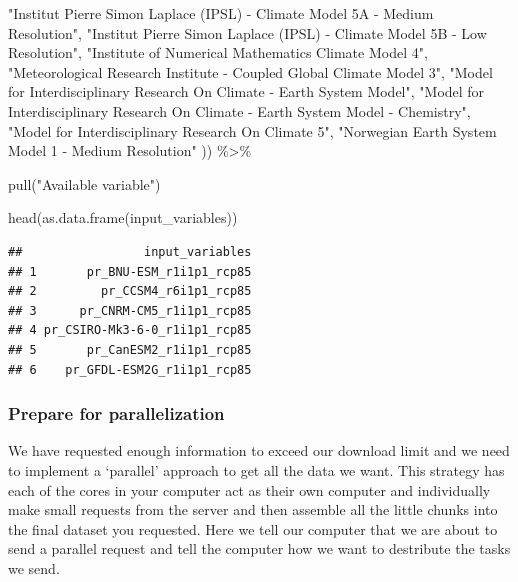 \documentclass[
  paper=a4,
  ,captions=tableheading
]{scrartcl}
\newenvironment{Shaded}{\begin{snugshade}}{\end{snugshade}}
\newcommand{\FunctionTok}[1]{\textcolor[rgb]{0.00,0.00,0.00}{#1}}
\newcommand{\NormalTok}[1]{#1}
\newcommand{\SpecialCharTok}[1]{\textcolor[rgb]{0.00,0.00,0.00}{#1}}
\newcommand{\StringTok}[1]{\textcolor[rgb]{0.31,0.60,0.02}{#1}}
\begin{document}
\begin{Shaded}
\begin{Highlighting}[]
 \StringTok{"Institut Pierre Simon Laplace (IPSL) {-} Climate Model 5A {-} Medium Resolution"}\NormalTok{,                  }
 \StringTok{"Institut Pierre Simon Laplace (IPSL) {-} Climate Model 5B {-} Low Resolution"}\NormalTok{,                     }
 \StringTok{"Institute of Numerical Mathematics Climate Model 4"}\NormalTok{,                                           }
 \StringTok{"Meteorological Research Institute {-} Coupled Global Climate Model 3"}\NormalTok{,                           }
 \StringTok{"Model for Interdisciplinary Research On Climate {-} Earth System Model"}\NormalTok{,                         }
 \StringTok{"Model for Interdisciplinary Research On Climate {-} Earth System Model {-} Chemistry"}\NormalTok{,             }
 \StringTok{"Model for Interdisciplinary Research On Climate 5"}\NormalTok{,                                            }
 \StringTok{"Norwegian Earth System Model 1 {-} Medium Resolution"}\NormalTok{  )) }\SpecialCharTok{\%\textgreater{}\%}
  
  \FunctionTok{pull}\NormalTok{(}\StringTok{"Available variable"}\NormalTok{)}

\FunctionTok{head}\NormalTok{(}\FunctionTok{as.data.frame}\NormalTok{(input\_variables))}
\end{Highlighting}
\end{Shaded}

\begin{verbatim}
##                 input_variables
## 1       pr_BNU-ESM_r1i1p1_rcp85
## 2         pr_CCSM4_r6i1p1_rcp85
## 3      pr_CNRM-CM5_r1i1p1_rcp85
## 4 pr_CSIRO-Mk3-6-0_r1i1p1_rcp85
## 5       pr_CanESM2_r1i1p1_rcp85
## 6    pr_GFDL-ESM2G_r1i1p1_rcp85
\end{verbatim}

\hypertarget{prepare-for-parallelization}{%
\subsubsection{Prepare for
parallelization}\label{prepare-for-parallelization}}

We have requested enough information to exceed our download limit and we
need to implement a `parallel' approach to get all the data we want.
This strategy has each of the cores in your computer act as their own
computer and individually make small requests from the server and then
assemble all the little chunks into the final dataset you requested.
Here we tell our computer that we are about to send a parallel request
and tell the computer how we want to destribute the tasks we send.
\end{document}
